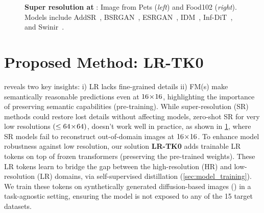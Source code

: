 

\begin{figure}[!t]
\centering
{}
\hfill
{}
\caption{
\textbf{Super resolution at {}}: Image from Pets (\textit{left}) and Food102 (\textit{right}). Models include AddSR~, BSRGAN~, ESRGAN~, IDM~, Inf-DiT~, and Swinir~.
}
\label{fig:sr_images}
\vspace{-6pt}
\end{figure}

\section{Proposed Method: LR-TK0}
\vspace{-4pt}
 reveals two key insights: i) LR lacks fine-grained details ii) FM(s) make semantically reasonable predictions even at $16\!\times\!16$, 
highlighting the importance of preserving semantic capabilities (pre-training).
While super-resolution (SR) methods could restore lost details without affecting models, zero-shot SR for very low resolutions $(\le64\!\times\!64)$, doesn't work well in practice, as shown in \cref{fig:sr_images}, where SR models fail to reconstruct out-of-domain images at $16\!\times\!16$.
To enhance model robustness against low resolution, our solution \textbf{LR-TK0} adds 
trainable LR tokens on top of frozen transformers (preserving the pre-trained weights).
These LR tokens learn to bridge the gap between the high-resolution (HR) and low-resolution (LR) domains, via self-supervised distillation (\cref{sec:model_training}).
We train these tokens on synthetically generated diffusion-based images () in a task-agnostic setting, ensuring the model is not exposed to any of the 15 target datasets.
\vspace{-5pt}






